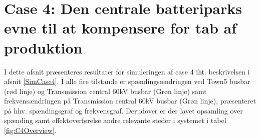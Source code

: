 
\section{Case 4: Den centrale batteriparks evne til at kompensere for tab af produktion}
I dette afsnit præsenteres resultater for simuleringen af case 4 iht. beskrivelsen i afsnit \ref{SimCase4}. I alle fire tilstande er spændingsændringen ved Town5 busbar (rød linje) og Transmission central 60kV busbar (Grøn linje) samt frekvensændringen på Transmission central 60kV busbar (Grøn linje), præsenteret på hhv. spændingsgraf og frekvensgraf. Derudover er der lavet opsamling over spænding samt effektoverførelse andre relevante steder i systemet i tabel \ref{fig:C4Overview}. \\ \\

